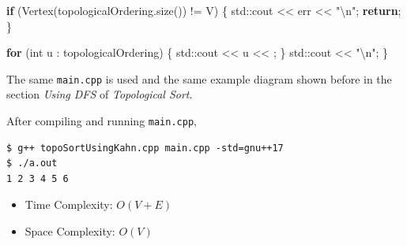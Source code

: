 \documentclass[
]{article}
\newenvironment{Shaded}{}{}
\newcommand{\BuiltInTok}[1]{#1}
\newcommand{\CharTok}[1]{\textcolor[rgb]{0.25,0.44,0.63}{#1}}
\newcommand{\ControlFlowTok}[1]{\textcolor[rgb]{0.00,0.44,0.13}{\textbf{#1}}}
\newcommand{\DataTypeTok}[1]{\textcolor[rgb]{0.56,0.13,0.00}{#1}}
\newcommand{\NormalTok}[1]{#1}
\newcommand{\SpecialCharTok}[1]{\textcolor[rgb]{0.25,0.44,0.63}{#1}}
\newcommand{\StringTok}[1]{\textcolor[rgb]{0.25,0.44,0.63}{#1}}
\begin{document}
\begin{Shaded}
\begin{Highlighting}[]
    \ControlFlowTok{if}\NormalTok{ (Vertex(topologicalOrdering.size()) != V) \{}
        \BuiltInTok{std::}\NormalTok{cout \textless{}\textless{} err \textless{}\textless{} }\StringTok{"}\SpecialCharTok{\textbackslash{}n}\StringTok{"}\NormalTok{;}
        \ControlFlowTok{return}\NormalTok{;}
\NormalTok{    \}}

    \ControlFlowTok{for}\NormalTok{ (}\DataTypeTok{int}\NormalTok{ u : topologicalOrdering) \{}
        \BuiltInTok{std::}\NormalTok{cout \textless{}\textless{} u \textless{}\textless{} }\CharTok{\textquotesingle{} \textquotesingle{}}\NormalTok{;}
\NormalTok{    \}}
    \BuiltInTok{std::}\NormalTok{cout \textless{}\textless{} }\StringTok{"}\SpecialCharTok{\textbackslash{}n}\StringTok{"}\NormalTok{;}
\NormalTok{\}}
\end{Highlighting}
\end{Shaded}

The same \texttt{main.cpp} is used and the same example diagram shown
before in the section \emph{Using DFS} of \emph{Topological Sort}.

After compiling and running \texttt{main.cpp},

\begin{verbatim}
$ g++ topoSortUsingKahn.cpp main.cpp -std=gnu++17 
$ ./a.out
1 2 3 4 5 6 
\end{verbatim}

\begin{itemize}
\item
  Time Complexity: \(O(V+E)\)
\item
  Space Complexity: \(O(V)\)
\end{itemize}
\end{document}
